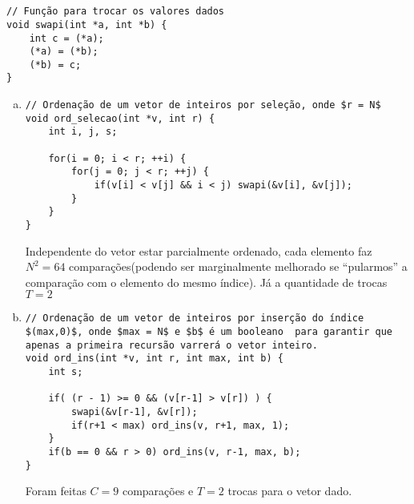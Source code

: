 \documentclass{article}
\begin{document}


\section{}
	\begin{enumerate}[]
	\begin{verbatim}
// Função para trocar os valores dados
void swapi(int *a, int *b) {
	int c = (*a);
	(*a) = (*b);
	(*b) = c;
}
	\end{verbatim}
	\end{enumerate}

	\begin{enumerate}[a)]
		\item \mbox{}
			\begin{verbatim}
// Ordenação de um vetor de inteiros por seleção, onde $r = N$
void ord_selecao(int *v, int r) {
	int i, j, s;
				
	for(i = 0; i < r; ++i) {
		for(j = 0; j < r; ++j) {
			if(v[i] < v[j] && i < j) swapi(&v[i], &v[j]);
		}
	}
}
			\end{verbatim}
			Independente do vetor estar parcialmente ordenado, cada elemento faz $N^2 = 64$ comparações(podendo ser marginalmente melhorado se ``pularmos'' a comparação com o elemento do mesmo índice). Já a quantidade de trocas $T = 2$
		\item \mbox{}
			\begin{verbatim}
// Ordenação de um vetor de inteiros por inserção do índice $(max,0)$, onde $max = N$ e $b$ é um booleano  para garantir que apenas a primeira recursão varrerá o vetor inteiro.
void ord_ins(int *v, int r, int max, int b) {
	int s;

	if( (r - 1) >= 0 && (v[r-1] > v[r]) ) {
		swapi(&v[r-1], &v[r]);
		if(r+1 < max) ord_ins(v, r+1, max, 1);
	}
	if(b == 0 && r > 0) ord_ins(v, r-1, max, b);
}
			\end{verbatim}
			Foram feitas $C = 9$ comparações e $T = 2$ trocas para o vetor dado.

	\end{enumerate}
\end{document}
